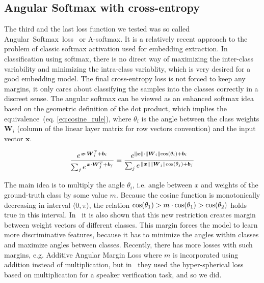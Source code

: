 \subsection*{Angular Softmax with cross-entropy}

The third and the last loss function we tested was so called Angular~Softmax~loss~\cite{A_softmax_original} or A-softmax. It is a relatively recent approach to the problem of classic softmax activation used for embedding extraction. In classification using softmax, there is no direct way of maximizing the inter-class variability and minimizing the intra-class variablity, which is very desired for a good embedding model. The final cross-entropy loss is not forced to keep any margins, it only cares about classifying the samples into the classes correctly in a discreet sense. The angular softmax can be viewed as an enhanced softmax idea based on the geometric definition of the dot product, which implies the equivalence~(eq. \ref{eq:cosine_rule}), where $ \theta_i $ is the angle between the class weights $ \boldsymbol{W}_i $ (column of the linear layer matrix for row vectors convention) and the input vector $ \boldsymbol{x} $.

\begin{equation} \label{eq:cosine_rule}
\frac{e^{\,\boldsymbol{x} \cdot \boldsymbol{W}_i^T + \boldsymbol{b}_i}}
{\sum_{j} e^{\,\boldsymbol{x} \cdot \boldsymbol{W}_j^T + \boldsymbol{b}_j}} =
\frac{e^{\lVert\boldsymbol{x}\rVert \cdot \lVert\boldsymbol{W}_i\rVert \textnormal{cos}(\theta_i)  + \boldsymbol{b}_i}}
{\sum_{j} e^{\,\lVert\boldsymbol{x}\rVert \lVert\boldsymbol{W}_j\rVert \textnormal{cos}(\theta_j)  + \boldsymbol{b}_j}}
\end{equation}

\medskip
\noindent
The main idea is to multiply the angle $ \theta_i $, i.e. angle between $ x $ and weights of the ground-truth class by some value $ m $. Because the cosine function is monotonically decreasing in interval $ \langle 0, \pi \rangle $, the relation $ \textnormal{cos}(\theta_1) > m \cdot \textnormal{cos}(\theta_1) > \textnormal{cos}(\theta_2) $ holds true in this interval. In~\cite{A_softmax_original} it is also shown that this new restriction creates margin between weight vectors of different classes. This margin forces the model to learn more discriminative features, because it has to minimize the angles within classes and maximize angles between classes. Recently, there has more losses with such margins, e.g. Additive Angular Margin Loss \cite{arc_face} where $ m $ is incorporated using addition instead of multiplication, but in~\cite{A_softmax} they used the hyper-spherical loss based on multiplication for a speaker verification task, and so we did.

